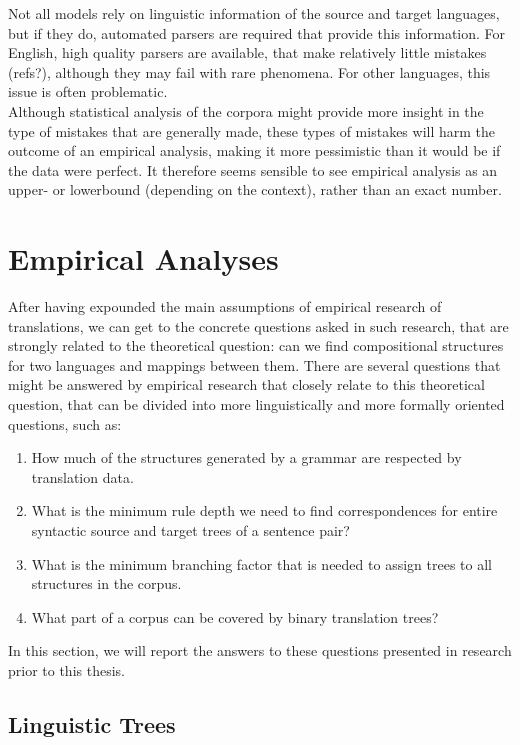 \documentclass{report}
\theoremstyle{definition}
\theoremstyle{plain}
\begin{document}
Not all models rely on linguistic information of the source and target languages, but if they do, automated parsers are required that provide this information. For English, high quality parsers are available, that make relatively little mistakes (refs?), although they may fail with rare phenomena. For other languages, this issue is often problematic.\\

Although statistical analysis of the corpora might provide more insight in the type of mistakes that are generally made, these types of mistakes will harm the outcome of an empirical analysis, making it more pessimistic than it would be if the data were perfect. It therefore seems sensible to see empirical analysis as an upper- or lowerbound (depending on the context), rather than an exact number.


\section{Empirical Analyses}

After having expounded the main assumptions of empirical research of translations, we can get to the concrete questions asked in such research, that are strongly related to the theoretical question: can we find compositional structures for two languages and mappings between them. There are several questions that might be answered by empirical research that closely relate to this theoretical question, that can be divided into more linguistically and more formally oriented questions, such as:

\begin{enumerate}
\item How much of the structures generated by a grammar are respected by translation data.
\item What is the minimum rule depth we need to find correspondences for entire syntactic source and target trees of a sentence pair?
\item What is the minimum branching factor that is needed to assign trees to all structures in the corpus.
\item What part of a corpus can be covered by binary translation trees?
\end{enumerate}

In this section, we will report the answers to these questions presented in research prior to this thesis.

\subsection{Linguistic Trees}
\end{document}
